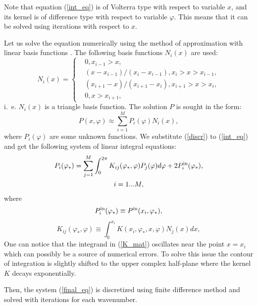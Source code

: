 \documentclass{procDDs}
\begin{document}
Note that equation (\ref{int_eq}) is of Volterra type with respect to variable $x$, and its kernel is of difference type with respect to variable $\varphi$.
This means that it can be solved using iterations with respect to $x$.

Let us solve the equation numerically using the method of approximation with linear basis functions \cite{Zenkevich}. The following basis functions $N_i(x)$ are used:
\begin{equation}
N_i(x) = 
\begin{cases}
& 0, x_{i-1}>x,\\
&(x-x_{i-1})/(x_{i} - x_{i-1}), x_{i}>x>x_{i-1},\\
&(x_{i+1}-x)/(x_{i+1} - x_i), x_{i+1}>x>x_i,\\
&0, x>x_{i+1},
\end{cases}
\end{equation}
i.~e. $N_i(x)$ is a triangle basis function.
The solution $P$ is sought in the form:
\begin{equation} \label{discr}
P(x, \varphi) \approx \sum_{i=1}^M P_i(\varphi) N_i(x),
\end{equation}
where $P_i(\varphi)$ are some unknown functions.
We substitute (\ref{discr}) to (\ref{int_eq}) and get the following system of linear integral equations:
\begin{multline} \label{final_eq}
P_i(\varphi_*)   = \sum_{j=1}^{M}\int_0^{2\pi}K_{ij}(\varphi_*,\varphi)P_j(\varphi)d\varphi + 2P^{\rm in}_i(\varphi_*), 
\\ i = 1...M,
\end{multline}
where
\begin{equation}
P^{\rm in}_i(\varphi_*) \equiv P^{\rm in}(x_i,\varphi_*),
\end{equation}
\begin{equation}
\label{K_mat}
K_{ij}(\varphi_*,\varphi) \equiv \int_0^{x_i}K(x_i,\varphi_*,x,\varphi)N_j(x)dx,
\end{equation}
One can notice that the integrand in (\ref{K_mat}) oscillates near the point $x=x_i$ which can possibly be a source of numerical errors. To solve this issue the contour of integration is slightly shifted to the upper complex half-plane where the kernel $K$ decays exponentially. 

Then, the system (\ref{final_eq}) is discretized  using finite difference method and solved with iterations for each wavenumber. 
\end{document}
